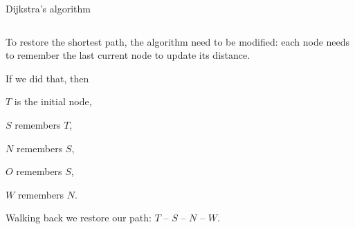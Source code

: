 \documentclass[9pt,aspectratio=169]{beamer}
\begin{document}
\begin{frame}{Dijkstra's algorithm}
\begin{columns}[T]
\begin{column}{0.5\textwidth}
      To restore the shortest path, the algorithm need to be modified: each node needs to remember the last current node to update its distance.

      If we did that, then 
      
      $T$ is the initial node,

      $S$ remembers $T$, 
      
      $N$ remembers $S$, 
      
      $O$ remembers $S$, 
      
      $W$ remembers $N$.

      Walking back we restore our path: $T$ -- $S$ -- $N$ -- $W$.
    \end{column}
  \end{columns}
\end{frame}
\end{document}
